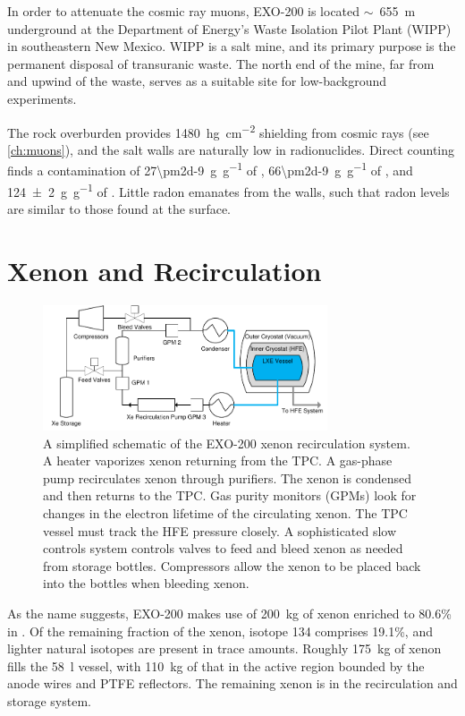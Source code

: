 \documentclass[herrin-thesis.tex]{subfiles}
\begin{document}
In order to attenuate the cosmic ray muons, EXO-200 is located \(\sim\)~\SI{655}{\m} underground at the Department of Energy's Waste Isolation Pilot Plant (WIPP) in southeastern New Mexico. WIPP is a salt mine, and its primary purpose is the permanent disposal of transuranic waste. The north end of the mine, far from and upwind of the waste, serves as a suitable site for low-background experiments.

The rock overburden provides \SI{1480}{\hecto\g\per\square\cm} shielding from cosmic rays (see \cref{ch:muons}), and the salt walls are naturally low in radionuclides. Direct counting finds a contamination of \SI[per-mode=symbol]{27\pm2d-9}{\g\per\g} of , \SI[per-mode=symbol]{66\pm2d-9}{\g\per\g} of , and \SI[per-mode=symbol]{124\pm2}{\g\per\g} of  \cite{Auger:2012dq}. Little radon emanates from the walls, such that radon levels are similar to those found at the surface.

\section{Xenon and Recirculation}

\begin{figure}[htbp]
\centering
\includegraphics[width=0.75\textwidth]{./figures/detector_simplified_xe.pdf}
\caption[The EXO-200 xenon recirculation system]{A simplified schematic of the EXO-200 xenon recirculation system. A heater vaporizes xenon returning from the TPC. A gas-phase pump recirculates xenon through purifiers. The xenon is condensed and then returns to the TPC. Gas purity monitors (GPMs) look for changes in the electron lifetime of the circulating xenon. The TPC vessel must track the HFE pressure closely. A sophisticated slow controls system controls valves to feed and bleed xenon as needed from storage bottles. Compressors allow the xenon to be placed back into the bottles when bleeding xenon.}
\label{fig:detector_simplified_xe}
\end{figure}

As the name suggests, EXO-200 makes use of \SI{200}{\kg} of xenon enriched to 80.6\% in . Of the remaining fraction of the xenon, isotope 134 comprises 19.1\%, and lighter natural isotopes are present in trace amounts. Roughly \SI{175}{\kg} of xenon fills the \SI{58}{\l} vessel, with \SI{110}{\kg} of that in the active region bounded by the anode wires and PTFE reflectors. The remaining xenon is in the recirculation and storage system.
\end{document}
